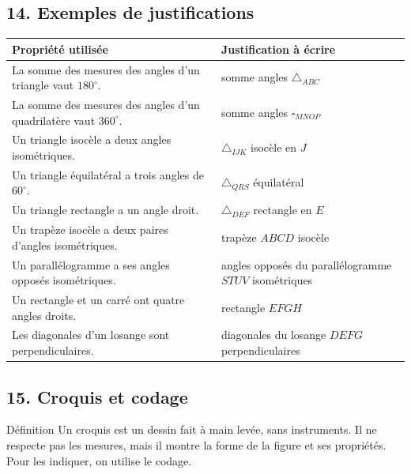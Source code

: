 \vspace{14pt}
\subsection*{14. Exemples de justifications}

\def\arraystretch{1.8}\setlength{\extrarowheight}{3pt}
\small
\begin{tabularx}{\linewidth}{|>{\raggedright\arraybackslash}X|>{\raggedright\arraybackslash}m{6.7cm}|}
\hline
\cellcolor{themeColor!30}\textbf{Propriété utilisée} & \cellcolor{themeColor!30}\textbf{Justification à écrire}\\\hline
La somme des mesures des angles d'un triangle vaut $180^\circ$. & somme angles $\triangle_{ABC}$\\\hline
La somme des mesures des angles d'un quadrilatère vaut $360^\circ$. & somme angles $\square_{MNOP}$\\\hline
Un triangle isocèle a deux angles isométriques. & $\triangle_{IJK}$ isocèle en $J$\\\hline
Un triangle équilatéral a trois angles de $60^\circ$. & $\triangle_{QRS}$ équilatéral\\\hline
Un triangle rectangle a un angle droit. & $\triangle_{DEF}$ rectangle en $E$\\\hline
Un trapèze isocèle a deux paires d'angles isométriques. & trapèze $ABCD$ isocèle\\\hline
Un parallélogramme a ses angles opposés isométriques. & angles opposés du parallélogramme $STUV$ isométriques\\\hline
Un rectangle et un carré ont quatre angles droits. & rectangle $EFGH$\\\hline
Les diagonales d'un losange sont perpendiculaires. & diagonales du losange $DEFG$ perpendiculaires\\\hline
\end{tabularx}
\normalsize
\def\arraystretch{1}\setlength{\extrarowheight}{0pt}

\vfill
\subsection*{15. Croquis et codage}

\begin{regle}{Définition}
Un \textcolor{themeColor}{croquis} est un dessin fait à main levée, sans instruments. Il ne respecte pas les mesures, mais il montre la \textcolor{themeColor}{forme} de la figure et ses \textcolor{themeColor}{propriétés}. Pour les indiquer, on utilise le \textcolor{themeColor}{codage}.
\end{regle}

